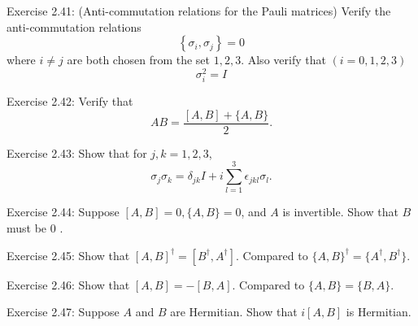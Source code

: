 \begin{exercise}
Exercise 2.41: (Anti-commutation relations for the Pauli matrices) Verify the anti-commutation relations
\begin{equation}
    \left\{\sigma_{i}, \sigma_{j}\right\}=0
\end{equation}
where $i \neq j$ are both chosen from the set $1,2,3$. Also verify that $(i=0,1,2,3)$
\begin{equation}
    \sigma_{i}^{2}=I
\end{equation}
\end{exercise}

\begin{exercise}
Exercise 2.42: Verify that
\begin{equation}
    A B=\frac{[A, B]+\{A, B\}}{2}.
\end{equation}
\end{exercise}

\begin{exercise}
Exercise 2.43: Show that for $j, k=1,2,3$,
\begin{equation}
    \sigma_{j} \sigma_{k}=\delta_{j k} I+i \sum_{l=1}^{3} \epsilon_{j k l} \sigma_{l}.
\end{equation}
\end{exercise}

\begin{exercise}
Exercise 2.44: Suppose $[A, B]=0,\{A, B\}=0$, and $A$ is invertible. Show that $B$ must be 0 .
\end{exercise}

\begin{exercise}
Exercise 2.45: Show that $[A, B]^{\dagger}=\left[B^{\dagger}, A^{\dagger}\right]$. Compared to $\{A, B\}^{\dagger}=\{A^{\dagger}, B^{\dagger}\}$.
\end{exercise}

\begin{exercise}
Exercise 2.46: Show that $[A, B]=-[B, A]$. Compared to $\{A, B\}=\{B, A\}$.
\end{exercise}

\begin{exercise}
Exercise 2.47: Suppose $A$ and $B$ are Hermitian. Show that $i[A, B]$ is Hermitian.
\end{exercise}
